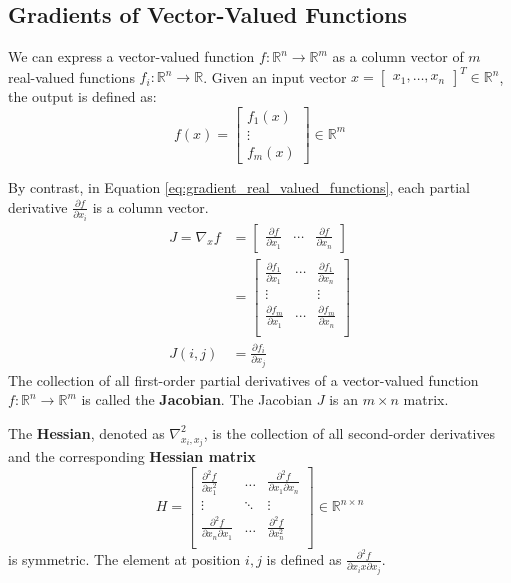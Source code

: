 \documentclass{article}
\begin{document}
\subsection{Gradients of Vector-Valued Functions}
We can express a vector-valued function $f:\mathbb{R}^n\to \mathbb{R}^m$ as a
column vector of $m$ real-valued functions $f_i:\mathbb{R}^n\to \mathbb{R}$.
Given an input vector $x=\begin{bmatrix} x_1,\ldots,x_n \end{bmatrix}^T\in
\mathbb{R}^n$, the output is defined as: 
$$
f(x)=\begin{bmatrix} f_1(x)\\
\vdots \\ f_m(x) \end{bmatrix}\in \mathbb{R}^m
$$
\begin{definition}[Jacobian]
    By contrast, in Equation \ref{eq:gradient_real_valued_functions}, each partial
    derivative $\frac{\partial f}{\partial x_i}$ is a column vector.
    $$
    \begin{aligned}
        J=\nabla_x f&=\begin{bmatrix}
            \frac{\partial{f}}{\partial{x_1}} & \cdots &
            \frac{\partial{f}}{\partial{x_n}}
        \end{bmatrix} \\ 
                  &=\begin{bmatrix}
                      \frac{\partial{f_1}}{\partial{x_1}} & \cdots &
                      \frac{\partial{f_1}}{\partial{x_n}} \\ 
                      \vdots & & \vdots \\ 
                      \frac{\partial{f_m}}{\partial{x_1}} & \cdots &
                      \frac{\partial{f_m}}{\partial{x_n}} \\ 
                  \end{bmatrix}\\
            J(i,j)&=\frac{\partial f_i}{\partial{x_j}}
    \end{aligned}
    $$
    The collection of all first-order partial derivatives of a vector-valued
    function $f:\mathbb{R}^n\to \mathbb{R}^m$ is called the \textbf{Jacobian}.
    The Jacobian $J$ is an $m\times n$ matrix.
\end{definition}
\begin{definition}[Hessian]
    The \textbf{Hessian}, denoted as $\nabla_{x_i,x_j}^2$, is the collection
    of all second-order derivatives and the corresponding \textbf{Hessian
    matrix}
    $$H=\begin{bmatrix}
        \frac{\partial^2f}{\partial x_1^2} & \ldots & \frac{\partial^2f}{\partial
        x_1\partial x_n} \\ 
        \vdots & \ddots & \vdots \\ 
        \frac{\partial^2f}{\partial x_n\partial x_1} & \ldots &
        \frac{\partial^2f}{\partial x_n^2} \\ 
    \end{bmatrix}\in\mathbb{R}^{n\times n}$$
    is symmetric. The element at position $i,j$ is defined as
    $\frac{\partial^2f}{\partial x_ix\partial x_j}$.
\end{definition}
\end{document}
